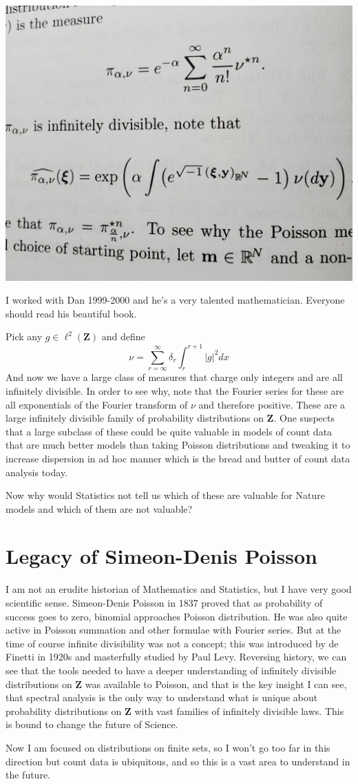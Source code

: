 \documentclass{amsart}
\begin{document}
\includegraphics[rotate=270,scale=0.1]{danbook.jpg}

I worked with Dan 1999-2000 and he's a very talented mathematician.  Everyone should read his beautiful book.

Pick any $g\in\ell^2(\mathbf{Z})$ and define
\[
\nu = \sum_{r = \infty}^\infty \delta_r \int_{r}^{r+1} |g|^2 dx
\]
And now we have a large class of measures that charge only integers and are all infinitely divisible. In order to see why, note that the Fourier series for these are all exponentials of the Fourier transform of $\nu$ and therefore positive.  These are a large infinitely divisible family of probability distributions on $\mathbf{Z}$.  One suspects that a large subclass of these could be quite valuable in models of count data that are much better models than taking Poisson distributions and tweaking it to increase dispersion in ad hoc manner which is the bread and butter of count data analysis today.

Now why would Statistics not tell us which of these are valuable for Nature models and which of them are not valuable?  

\section{Legacy of Simeon-Denis Poisson}

I am not an erudite historian of Mathematics and Statistics, but I have very good scientific sense.  Simeon-Denis Poisson in 1837 proved that as probability of success goes to zero, binomial approaches Poisson distribution.  He was also quite active in Poisson summation and other formulae with Fourier series.  But at the time of course infinite divisibility was not a concept; this was introduced by de Finetti in 1920s and masterfully studied by Paul Levy.  Reversing history, we can see that the tools needed to have a deeper understanding of infinitely divisible distributions on $\mathbf{Z}$ was available to Poisson, and that is the key insight I can see, that spectral analysis is the only way to understand what is unique about probability distributions on $\mathbf{Z}$ with vast families of infinitely divisible laws.  This is bound to change the future of Science.

Now I am focused on distributions on finite sets, so I won't go too far in this direction but count data is ubiquitous, and so this is a vast area to understand in the future.
\end{document}
